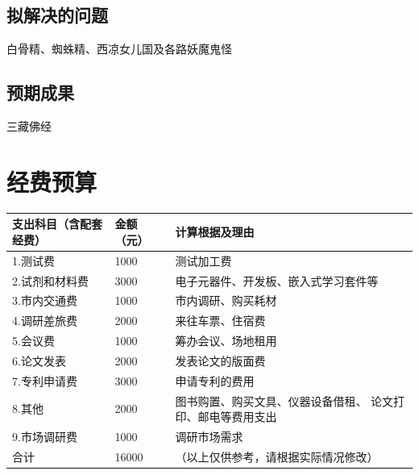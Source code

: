 \documentclass[12pt,a4paper,titlepage]{article}
\begin{document}
\subsection{拟解决的问题}
    白骨精、蜘蛛精、西凉女儿国及各路妖魔鬼怪
\subsection{预期成果}
    三藏佛经



\newpage
\section{经费预算}
\begin{tabular}{|p{8em}|l|p{20em}|}\hline
    支出科目（含配套经费） &
                   金额（元）& 计算根据及理由 \\\hline
    1.测试费       & 1000  & 测试加工费\\\hline
    2.试剂和材料费 & 3000  & 电子元器件、开发板、嵌入式学习套件等\\\hline
    3.市内交通费   & 1000  & 市内调研、购买耗材\\\hline
    4.调研差旅费   & 2000  & 来往车票、住宿费\\\hline
    5.会议费       & 1000  & 筹办会议、场地租用\\\hline
    6.论文发表     & 2000  & 发表论文的版面费\\\hline
    7.专利申请费   & 3000  & 申请专利的费用 \\\hline
    8.其他         & 2000  & 图书购置、购买文具、仪器设备借租、
                               论文打印、邮电等费用支出\\\hline
    9.市场调研费   & 1000  & 调研市场需求\\\hline
    合计           & 16000 & （以上仅供参考，请根据实际情况修改）\\\hline
\end{tabular}
\end{document}
